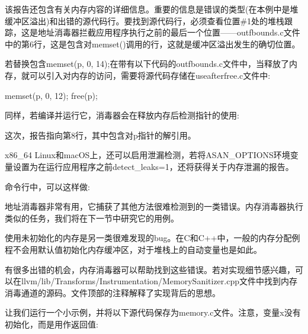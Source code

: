 该报告还包含有关内存内容的详细信息。重要的信息是错误的类型(在本例中是堆缓冲区溢出)和出错的源代码行。要找到源代码行，必须查看位置\#1处的堆栈跟踪，这是地址消毒器拦截应用程序执行之前的最后一个位置——outfbounds.c文件中的第6行，这是包含对memset()调用的行，这就是缓冲区溢出发生的确切位置。

若替换包含memset(p, 0, 14);在带有以下代码的outfbounds.c文件中，当释放了内存，就可以引入对内存的访问，需要将源代码存储在useafterfree.c文件中:

\begin{cpp}
memset(p, 0, 12);
free(p);
\end{cpp}

同样，若编译并运行它，消毒器会在释放内存后检测指针的使用:


这次，报告指向第8行，其中包含对p指针的解引用。

x86\_64 Linux和macOS上，还可以启用泄漏检测，若将ASAN\_OPTIONS环境变量设置为在运行应用程序之前detect\_leaks=1，还将获得关于内存泄漏的报告。

命令行中，可以这样做:


地址消毒器非常有用，它捕获了其他方法很难检测到的一类错误。内存消毒器执行类似的任务，我们将在下一节中研究它的用例。


使用未初始化的内存是另一类很难发现的bug。在C和C++中，一般的内存分配例程不会用默认值初始化内存缓冲区，对于堆栈上的自动变量也是如此。

有很多出错的机会，内存消毒器可以帮助找到这些错误。若对实现细节感兴趣，可以在llvm/lib/Transforms/Instrumentation/MemorySanitizer.cpp文件中找到内存消毒通道的源码。文件顶部的注释解释了实现背后的思想。

让我们运行一个小示例，并将以下源代码保存为memory.c文件。注意，变量x没有初始化，而是用作返回值:

